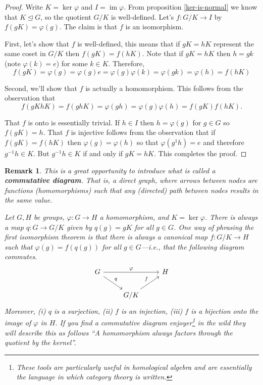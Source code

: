\documentclass[12pt]{article}
\numberwithin{equation}{subsection}
\theoremstyle{note}
\newtheorem{remark}[subsection]{Remark}
\newcommand{\nrml}{\trianglelefteq}
\newcommand{\img}{\operatorname{im}}
\begin{document}
\begin{proof}
	Write $K=\ker\varphi$ and $I=\img\varphi$. From proposition \ref{ker-is-normal} we know that $K\nrml G$, so the quotient $G/K$ is well-defined. Let's $f\colon G/K \to I$ by $f(gK)=\varphi(g)$. The claim is that $f$ is an isomorphism. 
	
	First, let's show that $f$ is well-defined, this means that if $gK=hK$ represent the same coset in $G/K$ then $f(gK)=f(hK)$. Note that if $gK=hK$ then $h=gk$ (note $\varphi(k)=e$) for some $k\in K$. Therefore, \[f(gK)=\varphi(g)=\varphi(g)e=\varphi(g)\varphi(k)=\varphi(gk)=\varphi(h)=f(hK)\]

	Second, we'll show that $f$ is actually a homomorphism. This follows from the observation that \[ f(gKhK)=f(ghK)=\varphi(gh)=\varphi(g)\varphi(h)=f(gK)f(hK).\]
	
	That $f$ is onto is essentially trivial. If $h\in I$ then $h=\varphi(g)$ for $g\in G$ so $f(gK)=h$. That $f$ is injective follows from the observation that if $f(gK)=f(hK)$ then $\varphi(g)=\varphi(h)$ so that $\varphi(g^{1}h)=e$ and therefore $g^{-1}h\in K$. But $g^{-1}h\in K$ if and only if $gK=hK$. This completes the proof. 
\end{proof}

\begin{remark}
This is a great opportunity to introduce what is called a \textbf{commutative diagram}. That is, a direct graph, where arrows between nodes are functions (homomorphisms) such that any (directed) path between nodes results in the same value. 

Let $G,H$ be groups, $\varphi\colon G\to H$ a homomorphism, and $K=\ker\varphi$. There is always a map $q\colon G\to G/K$ given by $q(g)=gK$ for all $g\in G$. One way of phrasing the first isomorphism theorem is that there is always a canonical map $f\colon G/K\to H$ such that $\varphi(g)=f(q(g))$ for all $g\in G$---i.e., that the following diagram commutes. 
\[\begin{tikzcd}
	G \arrow{rr}{\varphi} \arrow{rd}{q} && H \\
 &G/K \arrow{ru}{f}&
\end{tikzcd}\]
Moreover, (i) $q$ is a surjection, (ii) $f$ is an injection, (iii) $f$ is a bijection onto the image of $\varphi$ in $H$. If you find a commutative diagram enjoyer\footnote{These tools are particularly useful in homological algebra and are essentially \textit{the} language in which category theory is written.} in  the wild they will describe this as follows ``\textit{A homomorphism always factors through the quotient by the kernel}''.
\end{remark}
\end{document}
